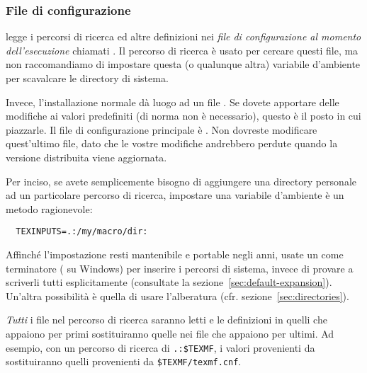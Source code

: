 \documentclass{article}
\begin{document}
\subsubsection{File di configurazione}

\KPS{} legge i percorsi di ricerca ed altre definizioni nei \emph{file di
configurazione al momento dell'esecuzione} chiamati . Il
percorso di ricerca  è usato per cercare questi file,
ma non raccomandiamo di impostare questa (o qualunque altra) variabile
d'ambiente per scavalcare le directory di sistema.

Invece, l'installazione normale dà luogo ad un file
. Se dovete apportare delle modifiche ai valori
predefiniti (di norma non è necessario), questo è il posto in cui
piazzarle. Il file di configurazione principale è
. Non dovreste modificare
quest'ultimo file, dato che le vostre modifiche andrebbero perdute quando
la versione distribuita viene aggiornata.

Per inciso, se avete semplicemente bisogno di aggiungere una directory
personale ad un particolare percorso di ricerca, impostare una variabile
d'ambiente è un metodo ragionevole:
\begin{verbatim}
  TEXINPUTS=.:/my/macro/dir:
\end{verbatim}
Affinché l'impostazione resti mantenibile e portable negli anni, usate un
\samp{:} come terminatore (\samp{;} su Windows) per inserire i percorsi di
sistema, invece di provare a scriverli tutti esplicitamente (consultate la
sezione~\ref{sec:default-expansion}). Un'altra possibilità è quella di
usare l'alberatura  (cfr.
sezione~\ref{sec:directories}).

\emph{Tutti} i file  nel percorso di ricerca saranno letti
e le definizioni in quelli che appaiono per primi sostituiranno quelle nei
file che appaiono per ultimi. Ad esempio, con un percorso di ricerca di
\verb|.:$TEXMF|, i valori provenienti da  sostituiranno
quelli provenienti da \verb|$TEXMF/texmf.cnf|.
\end{document}
